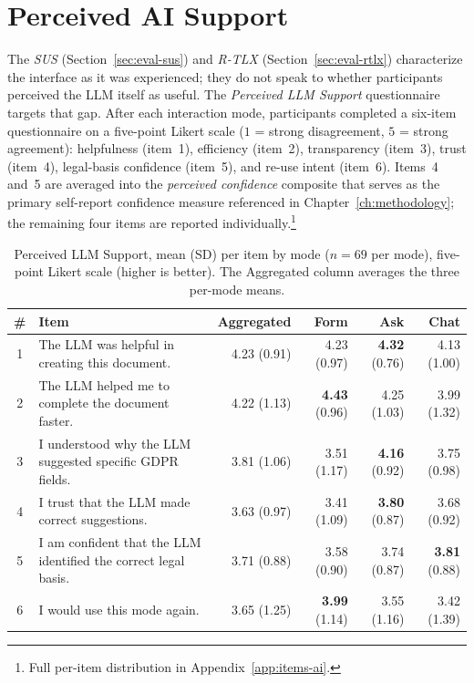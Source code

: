 \section{Perceived AI Support}
\label{sec:eval-ai-support}

The \textit{SUS} (Section~\ref{sec:eval-sus}) and \textit{R-TLX}
(Section~\ref{sec:eval-rtlx}) characterize the interface as it was
experienced; they do not speak to whether participants perceived
the LLM itself as useful.
The \textit{Perceived LLM Support}
questionnaire targets that gap. After each interaction mode,
participants completed a six-item questionnaire on a five-point
Likert scale ($1$ = strong disagreement, $5$ = strong agreement):
helpfulness (item~1), efficiency (item~2), transparency (item~3),
trust (item~4), legal-basis confidence (item~5), and re-use intent
(item~6). Items~4 and~5 are averaged into the \emph{perceived
confidence} composite that serves as the primary self-report
confidence measure referenced in Chapter~\ref{ch:methodology};
the remaining four items are reported individually.\footnote{Full
per-item distribution in Appendix~\ref{app:items-ai}.}

\begin{table}[htbp]
\centering
\caption{Perceived LLM Support, mean (SD) per item by mode
($n = 69$ per mode), five-point Likert scale (higher is better).
The Aggregated column averages the three per-mode means.}
\label{tab:ai-per-item}
\small
\begin{tabularx}{\linewidth}{@{}c X r r r r@{}}
\toprule
\# & Item & Aggregated & Form & Ask & Chat \\
\midrule
1 & The LLM was helpful in creating this document. & 4.23 (0.91) & 4.23 (0.97) & \textbf{4.32} (0.76) & 4.13 (1.00) \\
2 & The LLM helped me to complete the document faster. & 4.22 (1.13) & \textbf{4.43} (0.96) & 4.25 (1.03) & 3.99 (1.32) \\
3 & I understood why the LLM suggested specific GDPR fields. & 3.81 (1.06) & 3.51 (1.17) & \textbf{4.16} (0.92) & 3.75 (0.98) \\
4 & I trust that the LLM made correct suggestions. & 3.63 (0.97) & 3.41 (1.09) & \textbf{3.80} (0.87) & 3.68 (0.92) \\
5 & I am confident that the LLM identified the correct legal basis. & 3.71 (0.88) & 3.58 (0.90) & 3.74 (0.87) & \textbf{3.81} (0.88) \\
6 & I would use this mode again. & 3.65 (1.25) & \textbf{3.99} (1.14) & 3.55 (1.16) & 3.42 (1.39) \\
\bottomrule
\end{tabularx}
\end{table}

